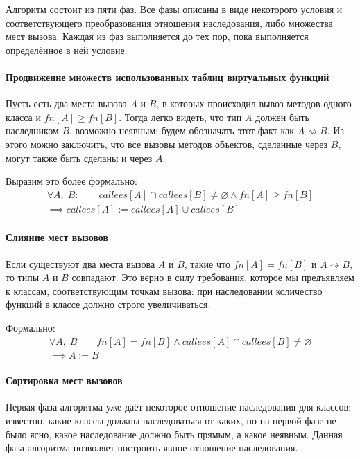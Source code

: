 \documentclass[a4paper,12pt,russian]{article}
\begin{document}
Алгоритм состоит из пяти фаз.
Все фазы описаны в виде некоторого условия и соответствующего преобразования отношения наследования, либо множества мест вызова.
Каждая из фаз выполняется до тех пор, пока выполняется определённое в ней условие.

\paragraph{Продвижение множеств использованных таблиц виртуальных функций}
Пусть есть два места вызова $A$ и $B$, в которых происходил вывоз методов одного класса и $fn[A] \geq fn[B]$.
Тогда легко видеть, что тип $A$ должен быть наследником $B$, возможно неявным; будем обозначать этот факт как $A \rightsquigarrow B$.
Из этого можно заключить, что все вызовы методов объектов, сделанные через $B$, могут также быть сделаны и через $A$.

Выразим это более формально:
\begin{eqnarray*}
\forall A,\;B:\qquad callees[A] \cap callees[B] \neq \varnothing \wedge fn[A] \geq fn[B]\\
\implies callees[A] := callees[A] \cup callees[B]
\end{eqnarray*}

\paragraph{Слияние мест вызовов}
Если существуют два места вызова $A$ и $B$, такие что $fn[A] = fn[B]$ и $A \rightsquigarrow B$, то типы $A$ и $B$ совпадают.
Это верно в силу требования, которое мы предъявляем к классам, соответствующим точкам вызова: при наследовании количество функций в классе должно строго увеличиваться.

Формально:
\begin{eqnarray*}
\forall A,\;B\qquad fn[A] = fn[B] \wedge callees[A] \cap callees[B] \neq \varnothing\\
\implies A := B
\end{eqnarray*}

\paragraph{Сортировка мест вызовов}
Первая фаза алгоритма уже даёт некоторое отношение наследования для классов: известно, какие классы должны наследоваться от каких, но на первой фазе не было ясно, какое наследование должно быть прямым, а какое неявным. Данная фаза алгоритма позволяет построить явное отношение наследования.
\end{document}
